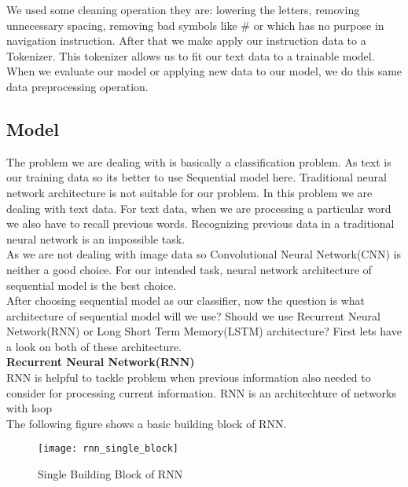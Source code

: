 We used some cleaning operation they are: lowering the letters, removing unnecessary spacing, removing bad symbols like \# or \text{*} which has no purpose in navigation instruction. After that we make apply our instruction data to a Tokenizer. This tokenizer allows us to fit our text data to a trainable model. \\

When we evaluate our model or applying new data to our model, we do this same data preprocessing operation. \\


\subsection{Model}
The problem we are dealing with is basically a classification problem. As text is our training data so its better to use Sequential model here. Traditional neural network architecture is not suitable for our problem. In this problem we are dealing with text data. For text data, when we are processing a particular word we also have to recall previous words. Recognizing previous data in a traditional neural network is an impossible task.\\

As we are not dealing with image data so Convolutional Neural Network(CNN) is neither a good choice. For our intended task, neural network architecture of sequential model is the best choice. \\

After choosing sequential model as our classifier, now the question is what architecture of sequential model will we use? Should we use Recurrent Neural Network(RNN) or Long Short Term Memory(LSTM) architecture? First lets have a look on both of these architecture. \\

\textbf{Recurrent Neural Network(RNN)} \\
RNN is helpful to tackle problem when previous information also needed to consider for processing current information. RNN is an architechture of networks with loop~\cite{colah2015} \\

The following figure shows a basic building block of RNN. \\

\begin{figure}[h]
    \centering
    \texttt{[image: rnn\_single\_block]}
    \caption{Single Building Block of RNN~\cite{colah2015}}
\end{figure}
\vline

